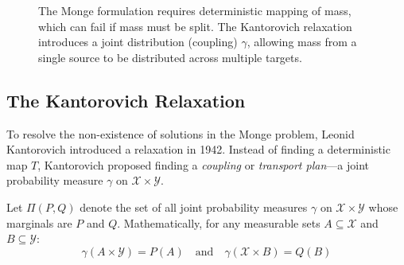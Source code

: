 \begin{figure}[h]
    \centering
    \caption{The Monge formulation requires deterministic mapping of mass, which can fail if mass must be split. The Kantorovich relaxation introduces a joint distribution (coupling) $\gamma$, allowing mass from a single source to be distributed across multiple targets.}
    \label{fig:monge_kantorovich}
\end{figure}

\subsection{The Kantorovich Relaxation}
To resolve the non-existence of solutions in the Monge problem, Leonid Kantorovich introduced a relaxation in 1942. Instead of finding a deterministic map $T$, Kantorovich proposed finding a \emph{coupling} or \emph{transport plan}—a joint probability measure $\gamma$ on $\mathcal{X} \times \mathcal{Y}$. 

Let $\Pi(P, Q)$ denote the set of all joint probability measures $\gamma$ on $\mathcal{X} \times \mathcal{Y}$ whose marginals are $P$ and $Q$. Mathematically, for any measurable sets $A \subseteq \mathcal{X}$ and $B \subseteq \mathcal{Y}$:
\[
\gamma(A \times \mathcal{Y}) = P(A) \quad \text{and} \quad \gamma(\mathcal{X} \times B) = Q(B)
\]

